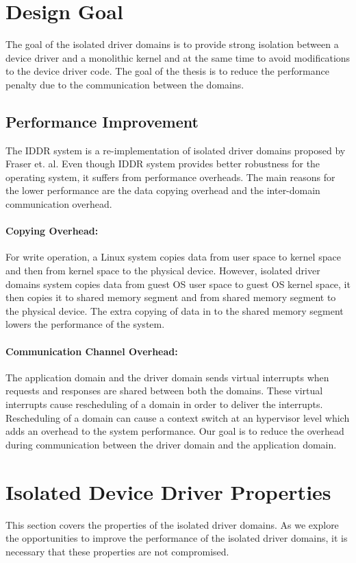 \section{Design Goal}\label{sec:goals}
The goal of the isolated driver domains is to provide strong isolation between a device driver and a monolithic kernel and at the same time to avoid modifications to the device driver code. The goal of the thesis is to reduce the performance penalty due to the communication between the domains. 

\subsection*{Performance Improvement}
The IDDR system is a re-implementation of isolated driver domains proposed by Fraser et. al. Even though IDDR system provides better robustness for the operating system, it suffers from performance overheads. The main reasons for the lower performance are the data copying overhead and the inter-domain communication overhead. 

\paragraph{Copying Overhead: } For write operation, a Linux system copies data from user space to kernel space and then from kernel space to the physical device. However, isolated driver domains system copies data from guest OS user space to guest OS kernel space, it then copies it to shared memory segment and from shared memory segment to the physical device. The extra copying of data in to the shared memory segment lowers the performance of the system. 

\paragraph{Communication Channel Overhead: } The application domain and the driver domain sends virtual interrupts when requests and responses are shared between both the domains. These virtual interrupts cause rescheduling of a domain in order to deliver the interrupts. Rescheduling of a domain can cause a context switch at an hypervisor level which adds an overhead to the system performance. Our goal is to reduce the overhead during communication between the driver domain and the application domain.

\section{Isolated Device Driver Properties}
\label{sec:properties}
This section covers the properties of the isolated driver domains. As we explore the opportunities to improve the performance of the isolated driver domains, it is necessary that these properties are not compromised.

